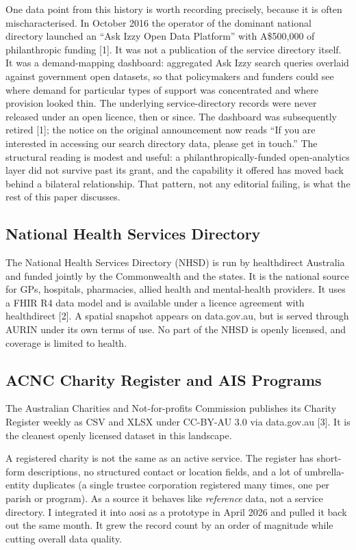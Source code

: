 \documentclass[11pt,a4paper]{article}
\begin{document}
One data point from this history is worth recording precisely, because it is often mischaracterised. In October 2016 the operator of the dominant national directory launched an ``Ask Izzy Open Data Platform'' with A\$500{,}000 of philanthropic funding [1]. It was not a publication of the service directory itself. It was a demand-mapping dashboard: aggregated Ask Izzy search queries overlaid against government open datasets, so that policymakers and funders could see where demand for particular types of support was concentrated and where provision looked thin. The underlying service-directory records were never released under an open licence, then or since. The dashboard was subsequently retired [1]; the notice on the original announcement now reads ``If you are interested in accessing our search directory data, please get in touch.'' The structural reading is modest and useful: a philanthropically-funded open-analytics layer did not survive past its grant, and the capability it offered has moved back behind a bilateral relationship. That pattern, not any editorial failing, is what the rest of this paper discusses.

\subsection{National Health Services Directory}

The National Health Services Directory (NHSD) is run by healthdirect Australia and funded jointly by the Commonwealth and the states. It is the national source for GPs, hospitals, pharmacies, allied health and mental-health providers. It uses a FHIR R4 data model and is available under a licence agreement with healthdirect [2]. A spatial snapshot appears on data.gov.au, but is served through AURIN under its own terms of use. No part of the NHSD is openly licensed, and coverage is limited to health.

\subsection{ACNC Charity Register and AIS Programs}

The Australian Charities and Not-for-profits Commission publishes its Charity Register weekly as CSV and XLSX under CC-BY-AU 3.0 via data.gov.au [3]. It is the cleanest openly licensed dataset in this landscape.

A registered charity is not the same as an active service. The register has short-form descriptions, no structured contact or location fields, and a lot of umbrella-entity duplicates (a single trustee corporation registered many times, one per parish or program). As a source it behaves like \emph{reference} data, not a service directory. I integrated it into aosi as a prototype in April 2026 and pulled it back out the same month. It grew the record count by an order of magnitude while cutting overall data quality.
\end{document}
